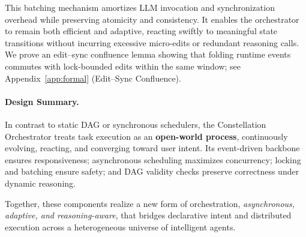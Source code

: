 \documentclass[10pt]{article} %
\newcommand{\eg}{\textit{e.g.},\xspace}
\begin{document}
This batching mechanism amortizes LLM invocation and synchronization overhead while preserving atomicity and consistency. It enables the orchestrator to remain both efficient and adaptive, reacting swiftly to meaningful state transitions without incurring excessive micro-edits or redundant reasoning calls. We prove an edit--sync confluence lemma showing that folding runtime events commutes with lock-bounded edits within the same window; see Appendix~\ref{app:formal} (Edit--Sync Confluence).

\paragraph{Design Summary.}
In contrast to static DAG or synchronous schedulers, the Constellation Orchestrator treats task execution as an \textbf{open-world process}, continuously evolving, reacting, and converging toward user intent. Its event-driven backbone ensures responsiveness; asynchronous scheduling maximizes concurrency; locking and batching ensure safety; and DAG validity checks preserve correctness under dynamic reasoning.  

Together, these components realize a new form of orchestration, \emph{asynchronous, adaptive, and reasoning-aware}, that bridges declarative intent and distributed execution across a heterogeneous universe of intelligent agents.

% 




\end{document}
